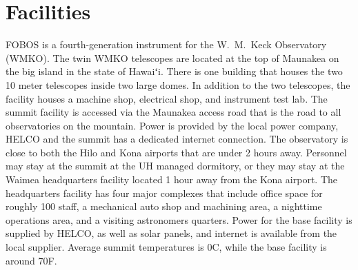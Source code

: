 \documentclass[oneside,11pt]{amsart}
\newcommand{\hawaii}{Hawaiʻi}
\begin{document}



\section{Facilities}


FOBOS is a fourth-generation instrument for the W.~M.\ Keck
Observatory (WMKO). The twin WMKO telescopes are located at the top
of Maunakea on the big island in the state of \hawaii. There is one
building that houses the two 10 meter telescopes inside two large
domes. In addition to the two telescopes, the facility houses a
machine shop, electrical shop, and instrument test lab. The summit
facility is accessed via the Maunakea access road that is the road to
all observatories on the mountain. Power is provided by the local
power company, HELCO and the summit has a dedicated internet
connection. The observatory is close to both the Hilo and Kona
airports that are under 2 hours away. Personnel may stay at the
summit at the UH managed dormitory, or they may stay at the Waimea
headquarters facility located 1 hour away from the Kona airport. The
headquarters facility has four major complexes that include office
space for roughly 100 staff, a mechanical auto shop and machining
area, a nighttime operations area, and a visiting astronomers
quarters. Power for the base facility is supplied by HELCO, as well
as solar panels, and internet is available from the local supplier.
Average summit temperatures is 0C, while the base facility is around
70F.
\end{document}
